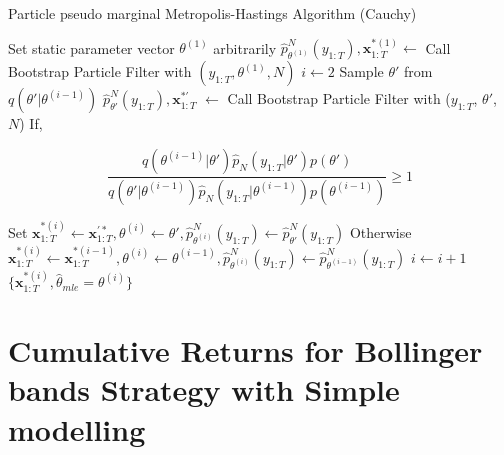 \documentclass[11pt,a4,twosided,singlespacing,titlepagenumber=on]{scrreprt}
\numberwithin{equation}{chapter} %
\theoremstyle{remark}
\newcommand{\matr}[1]{\mathbf{#1}}
\begin{document}
\begin{algorithm}[H]
\caption{Particle pseudo marginal Metropolis-Hastings Algorithm (Cauchy)}\label{algo_pmcmc_cauchy}
\begin{algorithmic}[1]
\State Set static parameter vector $\theta^{(1)}$ arbitrarily
\State $\hat{p}^N_{\theta^{(1)}}(y_{1:T}), \matr{x}^{*(1)}_{1:T} \gets$ Call Bootstrap Particle Filter with $(y_{1:T}, \theta^{(1)}, N)$
\State $i \gets 2$
	\State Sample $\theta'$ from $q(\theta'|\theta^{(i-1)})$
	\State $\hat{p}^N_{\theta'}(y_{1:T}), \matr{x}^{*'}_{1:T}$ $ \gets$ Call Bootstrap Particle Filter with ($y_{1:T}$, $\theta'$, $N$)
	\State If,
	
	$$\frac{q(\theta^{(i-1)}|\theta')\hat{p}_N(y_{1:T}|\theta')p(\theta')}{q(\theta'|\theta^{(i-1)})\hat{p}_N(y_{1:T}|\theta^{(i-1)})p(\theta^{(i-1)})} \geq 1$$
	
	\State Set $\matr{x}^{*(i)}_{1:T} \gets \matr{x}^{'*}_{1:T},\theta^{(i)} \gets \theta', \hat{p}^N_{\theta^{(i)}}(y_{1:T}) \gets \hat{p}^N_{\theta'}(y_{1:T})$
	\State Otherwise $\matr{x}^{*(i)}_{1:T} \gets \matr{x}^{*(i-1)}_{1:T},\theta^{(i)} \gets \theta^{(i-1)}, \hat{p}^N_{\theta^{(i)}}(y_{1:T}) \gets \hat{p}^N_{\theta^{(i-1)}}(y_{1:T})$
	\State $i \gets i + 1$
\\
\EndProcedure
\Return $\{ \matr{x}^{*(i)}_{1:T}, \hat{\theta}_{mle} = \theta^{(i)} \}$

\end{algorithmic}
\end{algorithm}


\section{Cumulative Returns for Bollinger bands Strategy with Simple modelling}
\label{app:portfolio_valuation_simple}
\end{document}
